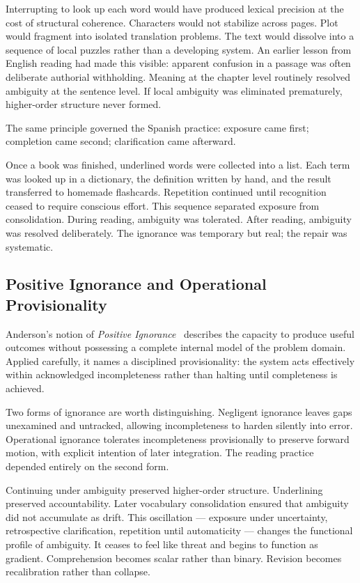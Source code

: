 \documentclass[11pt]{article}
\theoremstyle{remark}
\begin{document}
Interrupting to look up each word would have produced lexical precision at the cost of structural coherence. Characters would not stabilize across pages. Plot would fragment into isolated translation problems. The text would dissolve into a sequence of local puzzles rather than a developing system. An earlier lesson from English reading had made this visible: apparent confusion in a passage was often deliberate authorial withholding. Meaning at the chapter level routinely resolved ambiguity at the sentence level. If local ambiguity was eliminated prematurely, higher-order structure never formed.

The same principle governed the Spanish practice: exposure came first; completion came second; clarification came afterward.

Once a book was finished, underlined words were collected into a list. Each term was looked up in a dictionary, the definition written by hand, and the result transferred to homemade flashcards. Repetition continued until recognition ceased to require conscious effort. This sequence separated exposure from consolidation. During reading, ambiguity was tolerated. After reading, ambiguity was resolved deliberately. The ignorance was temporary but real; the repair was systematic.

\subsection{Positive Ignorance and Operational Provisionality}

Anderson's notion of \emph{Positive Ignorance}~\cite{anderson} describes the capacity to produce useful outcomes without possessing a complete internal model of the problem domain. Applied carefully, it names a disciplined provisionality: the system acts effectively within acknowledged incompleteness rather than halting until completeness is achieved.

Two forms of ignorance are worth distinguishing. Negligent ignorance leaves gaps unexamined and untracked, allowing incompleteness to harden silently into error. Operational ignorance tolerates incompleteness provisionally to preserve forward motion, with explicit intention of later integration. The reading practice depended entirely on the second form.

Continuing under ambiguity preserved higher-order structure. Underlining preserved accountability. Later vocabulary consolidation ensured that ambiguity did not accumulate as drift. This oscillation --- exposure under uncertainty, retrospective clarification, repetition until automaticity --- changes the functional profile of ambiguity. It ceases to feel like threat and begins to function as gradient. Comprehension becomes scalar rather than binary. Revision becomes recalibration rather than collapse.
\end{document}
